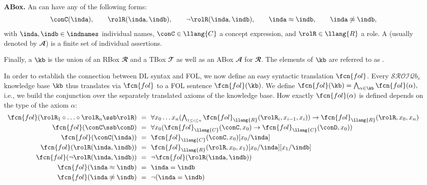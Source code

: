 \medskip\noindent\textbf{ABox. } 
%
An  can have any of the following forms:
$$\conC(\inda), \qquad \rolR(\inda,\indb), \qquad \neg\rolR(\inda,\indb), \qquad \inda\approx \indb, \qquad \inda\not\approx \indb,
$$%
with $\inda,\indb\in\indnames$ individual names, $\conC\in \llang{C}$ a concept expression, and $\rolR\in \llang{R}$ a role.
%
A \SROIQ{}  (usually denoted by $\mathbfcal{A}$) is a finite set of individual assertions. 

\medskip

Finally, a \SROIQ{}  $\kb$ is the union of an RBox $\mathbfcal{R}$ and a TBox $\mathbfcal{T}$ as well as an ABox $\mathbfcal{A}$ for $\mathbfcal{R}$. The elements of $\kb$ are referred to as . 

\bigskip

In order to establish the connection between DL syntax and FOL, we now define an easy syntactic translation $ \fcn{fol}$. Every $\mathcal{SROIQ}b_s$ knowledge base $\kb$ thus translates via $ \fcn{fol}$ to a FOL sentence $ \fcn{fol}(\kb)$. We define $\fcn{fol}(\kb)=\bigwedge_{\alpha\in \kb} \fcn{fol}(\alpha),$ i.e., we build the conjunction over the separately translated axioms of the knowledge base. How exactly $ \fcn{fol}(\alpha)$ is defined depends on the type of the axiom $\alpha$:
\[
\begin{array}{r@{\ \ }l@{\ \ }l}
	\fcn{fol}(\rolR_1\circ\ldots\circ\rolR_n\ssb\rolR) & = & \forall x_0\ldots x_n ( \bigwedge_{\scriptscriptstyle 1\leq i\leq n} \fcn{fol}_{ \llang{R}}(\rolR_i,x_{i-1},x_i)) \to  \fcn{fol}_{ \llang{R}}(\rolR,x_0,x_n)\\[1mm]
	\fcn{fol}(\conC\ssb\conD) & = & \forall x_0( \fcn{fol}_{ \llang{C}}(\conC,x_{0})\to  \fcn{fol}_{ \llang{C}}(\conD,x_{0}))\\[1mm]
	\fcn{fol}(\conC(\inda)) & = &  \fcn{fol}_{ \llang{C}}(\conC,x_{0})[x_0/\inda]\\[1mm]
	\fcn{fol}(\rolR(\inda,\indb)) & = &  \fcn{fol}_{ \llang{R}}(\rolR,x_{0},x_1)[x_0/\inda][x_1/\indb]\\[1mm]
	\fcn{fol}(\neg\rolR(\inda,\indb)) & = & \neg \fcn{fol}(\rolR(\inda,\indb))\\[1mm]
	\fcn{fol}(\inda\approx \indb) & = & \inda = \indb \\[1mm]
	\fcn{fol}(\inda\not\approx \indb) & = & \neg(\inda = \indb) \\
\end{array}
\]

